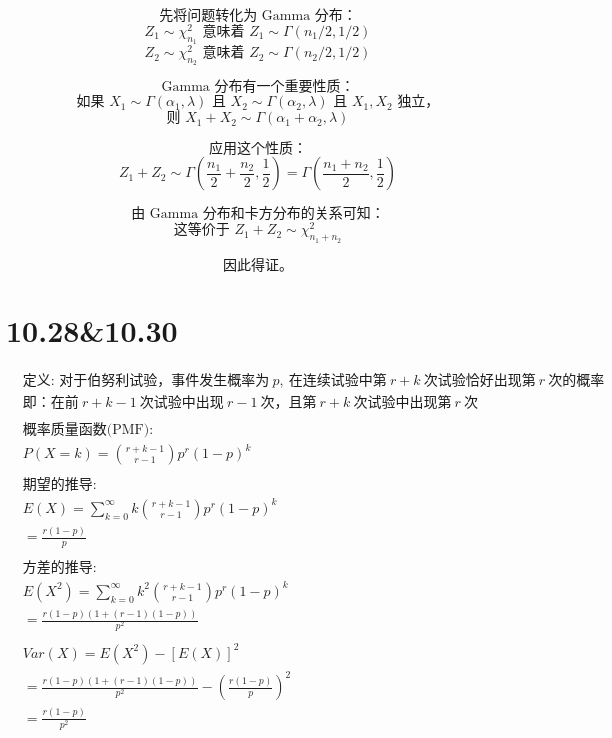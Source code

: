 \documentclass[UTF8]{report}
\theoremstyle{MyLineTheoremStyle} %
\theoremstyle{MyBlockTheoremStyle} %
\theoremstyle{MySubsubsectionStyle} %
\begin{document}
$$ \text{先将问题转化为 Gamma 分布：} $$
$$ Z_1 \sim \chi^2_{n_1} \text{ 意味着 } Z_1 \sim \Gamma(n_1/2, 1/2) $$
$$ Z_2 \sim \chi^2_{n_2} \text{ 意味着 } Z_2 \sim \Gamma(n_2/2, 1/2) $$

$$ \text{Gamma 分布有一个重要性质：} $$
$$ \text{如果 } X_1 \sim \Gamma(\alpha_1, \lambda) \text{ 且 } X_2 \sim \Gamma(\alpha_2, \lambda) \text{ 且 } X_1,X_2 \text{ 独立，} $$
$$ \text{则 } X_1 + X_2 \sim \Gamma(\alpha_1 + \alpha_2, \lambda) $$

$$ \text{应用这个性质：} $$
$$ Z_1 + Z_2 \sim \Gamma(\frac{n_1}{2} + \frac{n_2}{2}, \frac{1}{2}) = \Gamma(\frac{n_1+n_2}{2}, \frac{1}{2}) $$

$$ \text{由 Gamma 分布和卡方分布的关系可知：} $$
$$ \text{这等价于 } Z_1 + Z_2 \sim \chi^2_{n_1+n_2} $$

$$ \text{因此得证。} $$



\section{10.28\&10.30}

\begin{align*}
    & \text{定义: 对于伯努利试验，事件发生概率为}\ p,\ \text{在连续试验中第}\ r+k\ \text{次试验恰好出现第}\ r\ \text{次的概率} \\
    & \text{即：在前}\ r+k-1\ \text{次试验中出现}\ r-1\ \text{次，且第}\ r+k\ \text{次试验中出现第}\ r\ \text{次} \\
    \\
    & \text{概率质量函数(PMF):} \\
    & P(X=k) = \binom{r+k-1}{r-1}p^r(1-p)^k \\
    \\
    & \text{期望的推导:} \\
    & E(X) = \sum_{k=0}^{\infty} k \binom{r+k-1}{r-1}p^r(1-p)^k \\
    & = \frac{r(1-p)}{p} \\
    \\
    & \text{方差的推导:} \\
    & E(X^2) = \sum_{k=0}^{\infty} k^2 \binom{r+k-1}{r-1}p^r(1-p)^k \\
    & = \frac{r(1-p)(1+(r-1)(1-p))}{p^2} \\
    \\
    & Var(X) = E(X^2) - [E(X)]^2 \\
    & = \frac{r(1-p)(1+(r-1)(1-p))}{p^2} - (\frac{r(1-p)}{p})^2 \\
    & = \frac{r(1-p)}{p^2}
\end{align*}
\end{document}
